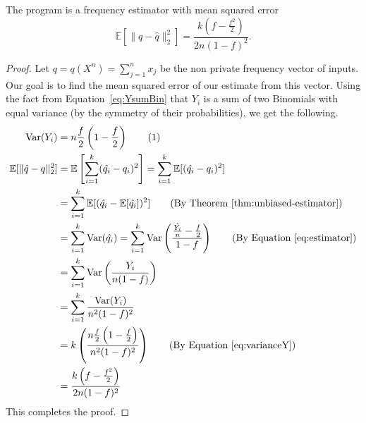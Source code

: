 \documentclass{article}
\newcommand\numberthis{\addtocounter{equation}{1}\tag{\theequation}}
\begin{document}
\begin{theorem}
	The program  is a frequency estimator with mean squared error
	\begin{equation*}
		\mathbb{E}[\|q-\hat{q}\|_2^2] = \frac{k\left(f-\frac{f^2}{2}\right)}{2n(1-f)^2}.
	\end{equation*}
\end{theorem}
\begin{proof}
    Let $q = q(X^n)=\sum\limits_{j=1}^n x_j$ be the non private frequency vector of inputs. Our goal is to find the mean squared error of our estimate from this vector. Using the fact from Equation~\ref{eq:YsumBin} that $Y_i$ is a sum of two Binomials with equal variance (by the symmetry of their probabilities), we get the following.
\begin{align*}
    \text{Var}(Y_i) &= n\frac{f}{2}\left(1-\frac{f}{2}\right) \numberthis \label{eq:varianceY}\\
    \mathbb{E}[\|\hat{q}-q\|_2^2] &= \mathbb{E}\left[\sum\limits_{i=1}^k(\hat{q_i}-q_i)^2\right] = \sum\limits_{i=1}^k\mathbb{E}[(\hat{q_i}-q_i)^2] \\
			&= \sum\limits_{i=1}^k\mathbb{E}[(\hat{q_i}-\mathbb{E}[\hat{q_i}])^2] \tag{By Theorem~\ref{thm:unbiased-estimator}}\\
			&= \sum\limits_{i=1}^k\text{Var}(\hat{q_i}) = \sum\limits_{i=1}^k\text{Var}\left(\frac{\frac{\hat{Y_i}}{n}-\frac{f}{2}}{1-f}\right) \tag{By Equation~\ref{eq:estimator}}\\
			&= \sum\limits_{i=1}^k\text{Var}\left(\frac{Y_i}{n(1-f)}\right) \\
			&= \sum\limits_{i=1}^k\frac{\text{Var}(Y_i)}{n^2(1-f)^2}\\
			&= k\left(\frac{n\frac{f}{2}\left(1-\frac{f}{2}\right)}{n^2(1-f)^2}\right) \tag{By Equation~\ref{eq:varianceY}}\\
			& = \frac{k\left(f-\frac{f^2}{2}\right)}{2n(1-f)^2}
\end{align*}
This completes the proof.
\end{proof}



\end{document}
